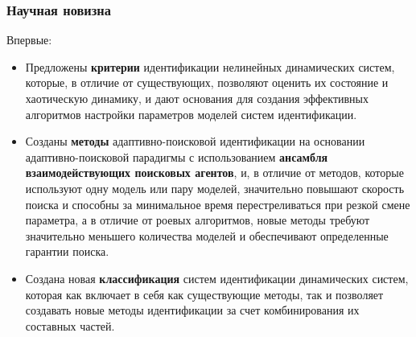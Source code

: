 \documentclass[10pt,utf8]{beamer}
\begin{document}
\begin{frame}
  \frametitle{Научная новизна}

  \noindent
  Впервые:

  \begin{itemize}

    \item
      Предложены \textbf{критерии} идентификации нелинейных динамических систем, которые, в
      отличие от существующих, позволяют оценить их состояние и хаотическую динамику,
      и дают основания для создания эффективных алгоритмов настройки параметров
      моделей систем идентификации.

    \item
      Созданы \textbf{методы} адаптивно-поисковой идентификации на основании
      адаптивно-поисковой парадигмы с использованием \textbf{ансамбля взаимодействующих поисковых агентов},
      и, в отличие от методов, которые
      используют одну модель или пару моделей, значительно повышают скорость поиска и
      способны за минимальное время перестреливаться при резкой смене параметра, а в
      отличие от роевых алгоритмов, новые методы требуют значительно меньшего
      количества моделей и обеспечивают определенные гарантии поиска.

    \item
      Создана новая \textbf{классификация} систем идентификации динамических систем, которая
      как включает в себя как существующие методы, так и позволяет создавать новые методы
      идентификации за счет комбинирования их составных частей.

  \end{itemize}


\end{frame}




\end{document}
